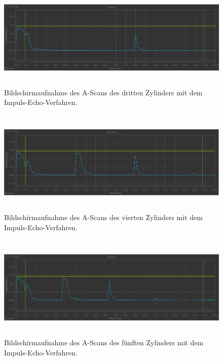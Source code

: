 \begin{figure}
    \centering
    \includegraphics[width=15cm, height=5cm]{build/Messung1.3.png}
    \caption{Bildschirmaufnahme des A-Scans des dritten Zylinders mit dem Impuls-Echo-Verfahren.}
    \label{m1.3}
\end{figure}

\begin{figure}
    \centering
    \includegraphics[width=15cm, height=5cm]{build/Messung1.4.png}
    \caption{Bildschirmaufnahme des A-Scans des vierten Zylinders mit dem Impuls-Echo-Verfahren.}
    \label{m1.4}
\end{figure}

\begin{figure}
    \centering
    \includegraphics[width=15cm, height=5cm]{build/Messung1.5.png}
    \caption{Bildschirmaufnahme des A-Scans des fünften Zylinders mit dem Impuls-Echo-Verfahren.}
    \label{m1.5}
\end{figure}

